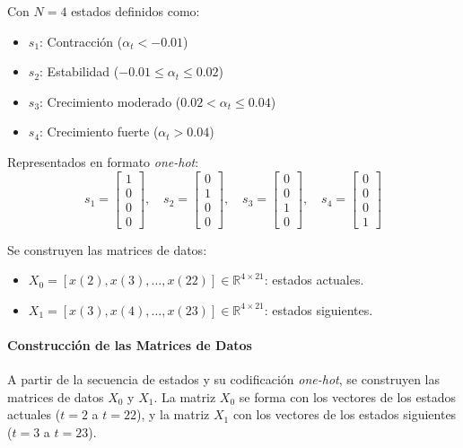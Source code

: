 \begin{examplex}
Con \(N = 4\) estados definidos como:
\begin{itemize}
    \item \(s_1\): Contracción (\(\alpha_t < -0.01\))
    \item \(s_2\): Estabilidad (\(-0.01 \leq \alpha_t \leq 0.02\))
    \item \(s_3\): Crecimiento moderado (\(0.02 < \alpha_t \leq 0.04\))
    \item \(s_4\): Crecimiento fuerte (\(\alpha_t > 0.04\))
\end{itemize}

Representados en formato \textit{one-hot}:
\[
s_1 = \begin{bmatrix} 1 \\ 0 \\ 0 \\ 0 \end{bmatrix},\quad
s_2 = \begin{bmatrix} 0 \\ 1 \\ 0 \\ 0 \end{bmatrix},\quad
s_3 = \begin{bmatrix} 0 \\ 0 \\ 1 \\ 0 \end{bmatrix},\quad
s_4 = \begin{bmatrix} 0 \\ 0 \\ 0 \\ 1 \end{bmatrix}
\]

Se construyen las matrices de datos:
\begin{itemize}
    \item \(X_0 = [x(2), x(3), \dots, x(22)] \in \mathbb{R}^{4 \times 21}\): estados actuales.
    \item \(X_1 = [x(3), x(4), \dots, x(23)] \in \mathbb{R}^{4 \times 21}\): estados siguientes.\\
\end{itemize}

\paragraph{Construcción de las Matrices de Datos}
A partir de la secuencia de estados y su codificación \textit{one-hot}, se construyen las matrices de datos \(X_0\) y \(X_1\). La matriz \(X_0\) se forma con los vectores de los estados actuales (\(t=2\) a \(t=22\)), y la matriz \(X_1\) con los vectores de los estados siguientes (\(t=3\) a \(t=23\)).


\end{examplex}
